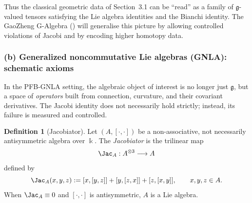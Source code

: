 \documentclass[11pt]{book}
\theoremstyle{plain}
\theoremstyle{definition}
\newtheorem{definition}[theorem]{Definition} \theoremstyle{remark}
\begin{document}
Thus the classical geometric data of Section~3.1 can be “read” as a
family of $\mathfrak{g}$-valued tensors satisfying the Lie algebra
identities and the Bianchi identity. The GaoZheng G-Algebra (\GAlgebra)
will generalise this picture by allowing controlled violations of
Jacobi and by encoding higher homotopy data.



\subsubsection*{(b) Generalized noncommutative Lie algebras (GNLA): schematic axioms}

In the PFB-GNLA setting, the algebraic object of interest is no longer
just $\mathfrak{g}$, but a space of \emph{operators} built from
connection, curvature, and their covariant derivatives. The Jacobi
identity does not necessarily hold strictly; instead, its failure is
measured and controlled.



\begin{definition}[Jacobiator]
Let $(A,[\cdot,\cdot])$ be a non-associative, not necessarily
  antisymmetric algebra over $\Bbbk$. The \emph{Jacobiator} is the
  trilinear map
  \[
     \Jac_A:
       A^{\otimes 3}\longrightarrow A
  \]
  defined by
  \[
     \Jac_A(x,y,z)
     :=
     [x,[y,z]] + [y,[z,x]] + [z,[x,y]],
     \qquad x,y,z\in A.
  \]
  When $\Jac_A\equiv 0$ and $[\cdot,\cdot]$ is antisymmetric, $A$
  is a Lie algebra.
\end{definition}
\end{document}
